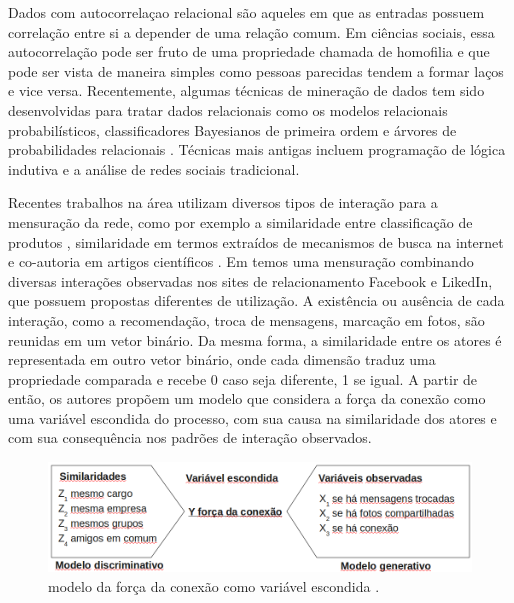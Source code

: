 Dados com autocorrelaçao relacional são aqueles em que as entradas possuem
correlação entre si a depender de uma relação comum. Em ciências sociais, essa
autocorrelação pode ser fruto de uma propriedade chamada de homofilia e que
pode ser vista de maneira simples como pessoas parecidas tendem a formar laços
e vice versa. Recentemente, algumas técnicas de mineração de dados tem sido
desenvolvidas para tratar dados relacionais como os modelos relacionais
probabilísticos, classificadores Bayesianos de primeira ordem e árvores de
probabilidades relacionais \citep{Jensen2003}. Técnicas mais antigas incluem
programação de lógica indutiva e a análise de redes sociais tradicional.

Recentes trabalhos na área utilizam diversos tipos de interação para a mensuração
da rede, como por exemplo a similaridade entre classificação de produtos
\citep{Richardson2002}, similaridade em termos extraídos de mecanismos de busca
na internet \citep{MATSUO2007} e co-autoria em artigos científicos
\citep{Kempe2003}. Em \citet{Xiang2010} temos uma mensuração combinando diversas
interações observadas nos sites de relacionamento Facebook e LikedIn, que possuem
propostas diferentes de utilização. A existência ou ausência de cada interação,
como a recomendação, troca de mensagens, marcação em fotos, são reunidas em um
vetor binário. Da mesma forma, a similaridade entre os atores é representada em
outro vetor binário, onde cada dimensão traduz uma propriedade comparada e recebe
0 caso seja diferente, 1 se igual. A partir de então, os autores propõem um
modelo que considera a força da conexão como uma variável escondida do processo,
com sua causa na similaridade dos atores e com sua consequência nos padrões de
interação observados.

\begin{figure}[h!]
	\centering
	\includegraphics[width=\textwidth]{imgs/modeloXiang.png}
	\caption{modelo da força da conexão como variável escondida \citep{Xiang2010}.}
	\label{fig:xiang}
\end{figure}

